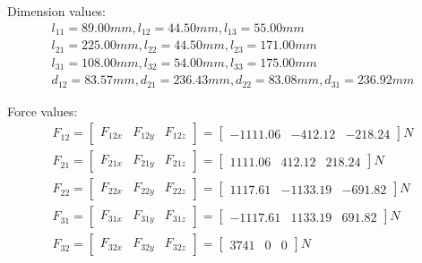 Dimension values:
\[
\begin{array}{l}
l_{11} = 89.00\unit{mm}, l_{12} = 44.50\unit{mm}, l_{13} = 55.00\unit{mm}\\
l_{21} = 225.00\unit{mm}, l_{22} = 44.50\unit{mm}, l_{23} = 171.00\unit{mm}\\
l_{31} = 108.00\unit{mm}, l_{32} = 54.00\unit{mm}, l_{33} = 175.00\unit{mm}\\
d_{12} = 83.57\unit{mm}, d_{21} = 236.43\unit{mm}, d_{22} = 83.08\unit{mm}, d_{31} = 236.92\unit{mm}
\end{array}
\]

Force values:
\[
\begin{array}{l}
F_{12} = \begin{bmatrix} F_{12x} & F_{12y} & F_{12z}\end{bmatrix} = \begin{bmatrix} -1111.06 & -412.12 & -218.24\end{bmatrix} \unit{N}\\
F_{21} = \begin{bmatrix} F_{21x} & F_{21y} & F_{21z}\end{bmatrix} = \begin{bmatrix} 1111.06 & 412.12 & 218.24\end{bmatrix} \unit{N}\\
F_{22} = \begin{bmatrix} F_{22x} & F_{22y} & F_{22z}\end{bmatrix} = \begin{bmatrix} 1117.61 & -1133.19 & -691.82\end{bmatrix} \unit{N}\\
F_{31} = \begin{bmatrix} F_{31x} & F_{31y} & F_{31z}\end{bmatrix} = \begin{bmatrix} -1117.61 & 1133.19 & 691.82 \end{bmatrix} \unit{N}\\
F_{32} = \begin{bmatrix} F_{32x} & F_{32y} & F_{32z}\end{bmatrix} = \begin{bmatrix} 3741 & 0 & 0 \end{bmatrix} \unit{N}\\
\end{array}
\]

